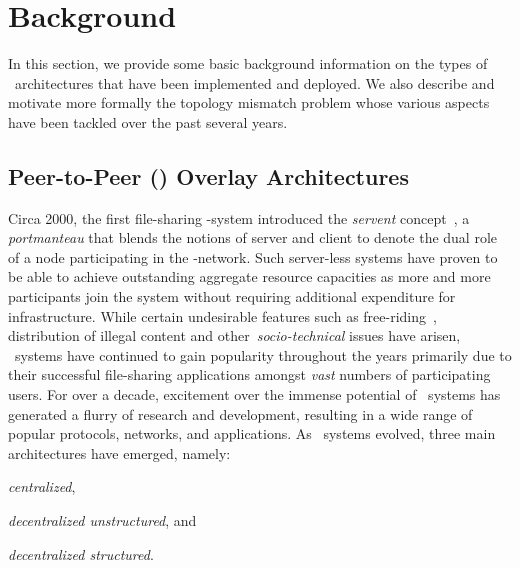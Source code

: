 \section{Background}
\label{section:background}

In this section, we provide some basic background information on the types of
\p\ architectures that have been implemented and deployed. We also
describe and motivate more formally the topology mismatch problem 
whose various aspects have been tackled over the past several years.

\subsection{Peer-to-Peer (\p) Overlay Architectures}
Circa 2000, the first file-sharing \p-system introduced the \emph{servent}
concept~\cite{gnutella}, a \emph{portmanteau} that blends the notions of server
and client to denote the dual role of a node participating in the \p-network. 
Such server-less systems have proven to be able to achieve outstanding
aggregate resource capacities as more and more participants join the system
without requiring additional expenditure for infrastructure. 
While certain undesirable features such as 
free-riding~\cite{saroiu_measurefileshare_2002,adar_gnutellafreeriders_2000,hughes_gnutellafreeride_2005},
distribution of illegal content and other~\emph{socio-technical}
issues \cite{hughes_socp2p_2008} have arisen, \p\ systems have
continued to gain popularity throughout the years primarily 
due to their successful file-sharing applications
amongst \emph{vast} numbers of participating users.
For over a decade, excitement over the immense potential of \p\ systems has
generated a flurry of research and development, resulting in a wide range of
popular protocols, networks, and applications. As \p\ systems evolved, three
main architectures have emerged, namely:
\begin{inparaenum}
  \item \emph{centralized},
  \item \emph{decentralized unstructured}, and
  \item \emph{decentralized structured}.
\end{inparaenum}

